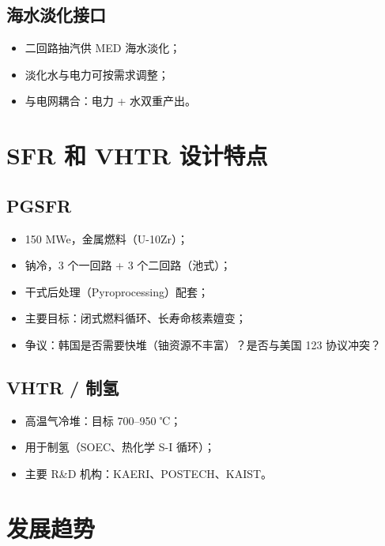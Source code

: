 \documentclass[
  UTF8,
  scheme=plain,
  fontsize=10pt,
  openany
]{ctexbook}
\begin{document}
\subsection{海水淡化接口}\label{ux6d77ux6c34ux6de1ux5316ux63a5ux53e3}

\begin{itemize}
\tightlist
\item
  二回路抽汽供 MED 海水淡化；
\item
  淡化水与电力可按需求调整；
\item
  与电网耦合：电力 + 水双重产出。
\end{itemize}

\section{SFR 和 VHTR
设计特点}\label{sfr-ux548c-vhtr-ux8bbeux8ba1ux7279ux70b9}

\subsection{PGSFR}\label{pgsfr}

\begin{itemize}
\tightlist
\item
  150 MWe，金属燃料（U-10Zr）；
\item
  钠冷，3 个一回路 + 3 个二回路（池式）；
\item
  干式后处理（Pyroprocessing）配套；
\item
  主要目标：闭式燃料循环、长寿命核素嬗变；
\item
  争议：韩国是否需要快堆（铀资源不丰富）？是否与美国 123 协议冲突？
\end{itemize}

\subsection{VHTR / 制氢}\label{vhtr-ux5236ux6c22}

\begin{itemize}
\tightlist
\item
  高温气冷堆：目标 700--950 ℃；
\item
  用于制氢（SOEC、热化学 S-I 循环）；
\item
  主要 R\&D 机构：KAERI、POSTECH、KAIST。
\end{itemize}

\section{发展趋势}\label{ux53d1ux5c55ux8d8bux52bf-3}
\end{document}
